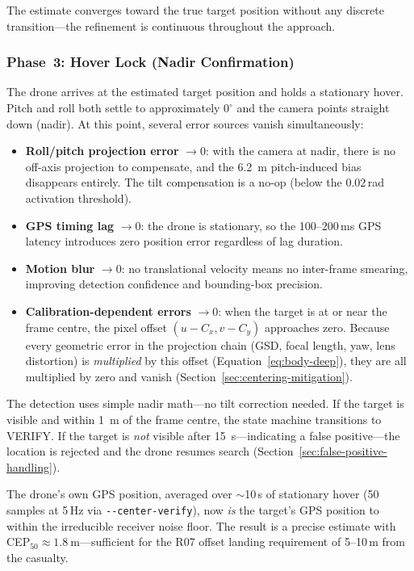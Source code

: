 \noindent The estimate converges toward the true target position without any discrete transition---the refinement is continuous throughout the approach.

\subsubsection{Phase~3: Hover Lock (Nadir Confirmation)}

The drone arrives at the estimated target position and holds a stationary hover.  Pitch and roll both settle to approximately $0^{\circ}$ and the camera points straight down (nadir).  At this point, several error sources vanish simultaneously:

\begin{itemize}
  \item \textbf{Roll/pitch projection error} $\to 0$: with the camera at nadir, there is no off-axis projection to compensate, and the \SI{6.2}{\metre} pitch-induced bias disappears entirely.  The tilt compensation is a no-op (below the $0.02$\,rad activation threshold).
  \item \textbf{GPS timing lag} $\to 0$: the drone is stationary, so the 100--200\,ms GPS latency introduces zero position error regardless of lag duration.
  \item \textbf{Motion blur} $\to 0$: no translational velocity means no inter-frame smearing, improving detection confidence and bounding-box precision.
  \item \textbf{Calibration-dependent errors} $\to 0$: when the target is at or near the frame centre, the pixel offset $(u - C_x, v - C_y)$ approaches zero.  Because every geometric error in the projection chain (GSD, focal length, yaw, lens distortion) is \emph{multiplied} by this offset (Equation~\ref{eq:body-deep}), they are all multiplied by zero and vanish (Section~\ref{sec:centering-mitigation}).
\end{itemize}

\noindent The detection uses simple nadir math---no tilt correction needed.  If the target is visible and within \SI{1}{\metre} of the frame centre, the state machine transitions to VERIFY.  If the target is \emph{not} visible after \SI{15}{\second}---indicating a false positive---the location is rejected and the drone resumes search (Section~\ref{sec:false-positive-handling}).

The drone's own GPS position, averaged over $\sim$10\,s of stationary hover (50 samples at 5\,Hz via \texttt{-{}-center-verify}), now \emph{is} the target's GPS position to within the irreducible receiver noise floor.  The result is a precise estimate with CEP$_{50} \approx \SI{1.8}{\metre}$---sufficient for the R07 offset landing requirement of 5--10\,m from the casualty.


